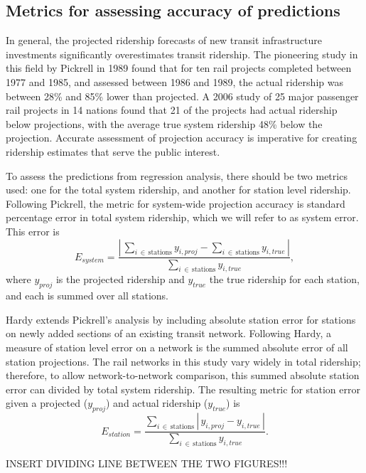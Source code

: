 \documentclass[11pt]{article}
\begin{document}
\subsection{Metrics for assessing accuracy of predictions}\label{sec:metric}

In general, the projected ridership forecasts of new transit infrastructure investments significantly overestimates transit ridership. The pioneering study in this field by Pickrell in 1989 \cite{Pickrell1989} found that for ten rail projects completed between 1977 and 1985, and assessed between 1986 and 1989, the actual ridership was between 28\% and 85\% lower than projected. A 2006 study \cite{Flyvbjerg2006} of 25 major passenger rail projects in 14 nations found that 21 of the projects had actual ridership below projections, with the average true system ridership 48\% below the projection. Accurate assessment of projection accuracy is imperative for creating ridership estimates that serve the public interest.

To assess the predictions from regression analysis, there should be two metrics used: one for the total system ridership, and another for station level ridership. Following Pickrell, the metric for system-wide projection accuracy is standard percentage error in total system ridership, which we will refer to as system error. This error is
$$E_{system} = \dfrac{\left|\,\sum\limits_{i\,\in\,\text{stations}} y_{i, proj} - \sum\limits_{i\,\in\,\text{stations}} y_{i, true}\,\right|}{\sum\limits_{i\,\in\,\text{stations}} y_{i, true}},$$
where $y_{proj}$ is the projected ridership and $y_{true}$ the true ridership for each station, and each is summed over all stations.

Hardy \cite{Hardy2010} extends Pickrell's analysis by including absolute station error for stations on newly added sections of an existing transit network. Following Hardy, a measure of station level error on a network is the summed absolute error of all station projections. The rail networks in this study vary widely in total ridership; therefore, to allow network-to-network comparison, this summed absolute station error can divided by total system ridership. The resulting metric for station error given a projected ($y_{proj}$) and actual ridership ($y_{true}$) is 
$$E_{station} = \dfrac{\sum\limits_{i\,\in\,\text{stations}}\left|\,y_{i, proj} - y_{i, true}\,\right|}{\sum\limits_{i\,\in\,\text{stations}} y_{i, true}}.$$


INSERT DIVIDING LINE BETWEEN THE TWO FIGURES!!!
\end{document}
